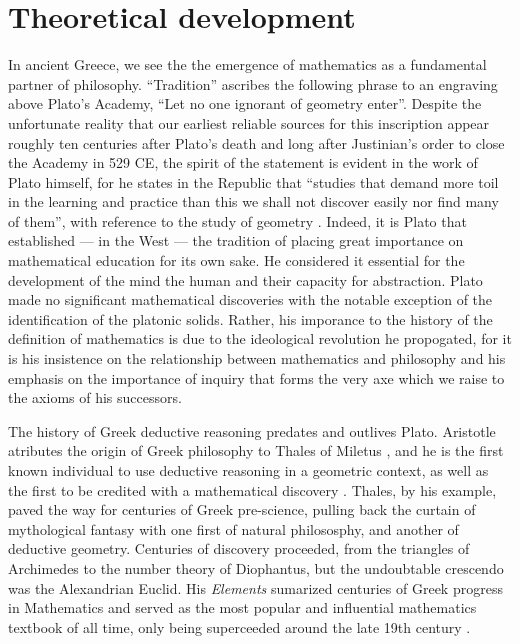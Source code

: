 \documentclass[12pt]{article}
\begin{document}

\section{Theoretical development}

In ancient Greece,
we see the the emergence of mathematics
as a fundamental partner of philosophy.
``Tradition'' ascribes the following phrase
to an engraving above Plato's Academy,
``Let no one ignorant of geometry enter''.
Despite the unfortunate reality that
our earliest reliable sources for this inscription
appear roughly ten centuries after Plato's death \cite{plato_truth}
and long after Justinian's order to close
the Academy in 529 CE, 
the spirit of the statement is evident
in the work of Plato himself,
for he states in the Republic that
``studies that demand more toil
in the learning and practice than this
we shall not discover easily
nor find many of them'',
with reference to
the study of geometry \cite{plato}.
Indeed, it is Plato that established ---
in the West ---
the tradition of placing great importance
on mathematical education
for its own sake.
He considered it essential
for the development
of the mind the human
and their capacity for abstraction.
Plato made no significant mathematical discoveries
with the notable exception of the identification
of the platonic solids.
Rather, his imporance to
the history of the definition of mathematics
is due to the ideological revolution he propogated,
for it is his insistence on the relationship between
mathematics and philosophy
and his emphasis on the importance of inquiry
that forms the very axe which we raise
to the axioms of his successors.

The history of
Greek deductive reasoning
predates and outlives Plato.
Aristotle atributes
the origin of
Greek philosophy
to Thales of Miletus \cite{aristotle_thales},
and he is the first known
individual to use
deductive reasoning in a geometric context,
as well as the first to be credited
with a mathematical discovery \cite{boyer1991}.
Thales, by his example,
paved the way for centuries of Greek pre-science,
pulling back the curtain of mythological fantasy
with one first of natural philososphy,
and another of deductive geometry.
Centuries of discovery proceeded,
from the triangles of Archimedes
to the number theory of Diophantus,
but the undoubtable crescendo
was the Alexandrian Euclid.
His \textit{Elements} sumarized
centuries of Greek progress in Mathematics
and served as the most popular
and influential mathematics textbook of all time,
only being superceeded around the late 19th century \cite{boyer1991}.
\end{document}
